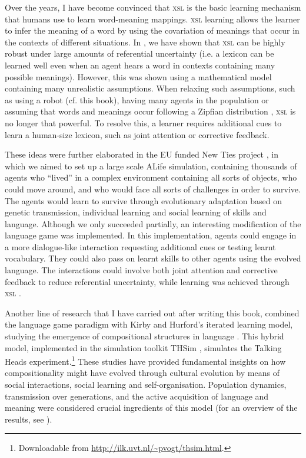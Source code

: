 Over the years, I have become convinced that {\scshape xsl} is the basic learning mechanism that humans use to learn word-meaning mappings. {\scshape xsl} learning allows the learner to infer the meaning of a word by using the covariation of meanings that occur in the contexts of different situations. In \citet{smithetal:2006}, we have shown that {\scshape xsl} can be highly robust under large amounts of referential uncertainty (i.e. a lexicon can be learned well even when an agent hears a word in contexts containing many possible meanings). However, this was shown using a mathematical model containing many unrealistic assumptions. When relaxing such assumptions, such as using a robot (cf. this book), having many agents in the population \citep{vogtcoumans:2003} or assuming that words and meanings occur following a Zipfian distribution \citep{vogt:2012}, {\scshape xsl} is no longer that powerful. To resolve this, a learner requires additional cues to learn a human-size lexicon, such as joint attention or corrective feedback. 

These ideas were further elaborated in the EU funded New Ties project \citep{gilbertetal:2006}, in which we aimed to set up a large scale ALife simulation, containing thousands of agents who ``lived'' in a complex environment containing all sorts of objects, who could move around, and who would face all sorts of challenges in order to survive. The agents would learn to survive through evolutionary adaptation based on genetic transmission, individual learning and social learning of skills and language. Although we only succeeded partially, an interesting modification of the language game was implemented. In this implementation, agents could engage in a more dialogue-like interaction requesting additional cues or testing learnt vocabulary. They could also pass on learnt skills to other agents using the evolved language. The interactions could involve both joint attention and corrective feedback to reduce referential uncertainty, while learning was achieved through {\scshape xsl} \citep{vogtdivina:2007,vogthaasdijk:2010}.

Another line of research that I have carried out after writing this book, combined the language game paradigm with Kirby and Hurford's \citeyear{kirbyhurford:2002} {\sc iterated learning model}, studying the emergence of compositional structures in language \citep{vogt:2005a,vogt:2005b}. This hybrid model, implemented in the simulation toolkit THSim \citep{vogt:2003c}, simulates the Talking Heads experiment.\footnote{Downloadable from \url{http://ilk.uvt.nl/\~pvogt/thsim.html}.} These studies have provided fundamental insights on how compositionality might have evolv\-ed through cultural evolution by means of social interactions, social learning and self-organisation. Population dynamics, transmission over generations, and the active acquisition of language and meaning were considered crucial ingredients of this model (for an overview of the results, see \citealt{vogt:2007b}).  

